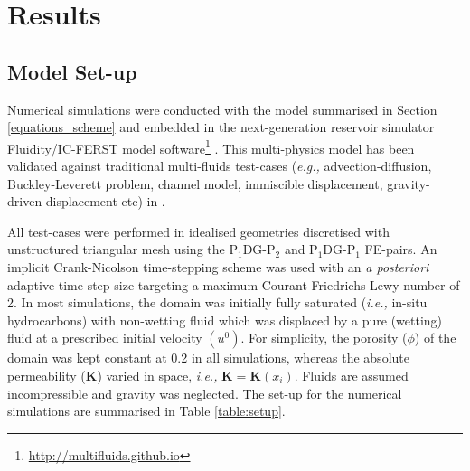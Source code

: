 \documentclass[preprint,authoryear,12pt]{elsarticle}
\newcommand{\PN}[2][error]{P$_{#1}$DG-P$_{#2}$}
\newcommand{\eg}{{\it e.g., }}
\newcommand{\ie}{{\it i.e., }}
\begin{document}


%

 

\section{Results}\label{section:results} 

\subsection{Model Set-up}\label{section:results:setup}
Numerical simulations were conducted with the model summarised in Section \ref{equations_scheme} and embedded in the next-generation reservoir simulator Fluidity/IC-FERST model software\footnote{\href{http://multifluids.github.io}{http://multifluids.github.io}} \citep[a full description of the model can be found in][]{porosity_documentation,fluidity_manual,jackson_2013,gomes_2017}. This multi-physics model has been validated against traditional multi-fluids test-cases (\eg advection-diffusion, Buckley-Leverett problem, channel model, immiscible displacement, gravity-driven displacement etc) in \citet{radunz_2014,jackson_2015,salinas2015,pavlidis2016}.
 
All test-cases were performed in idealised geometries discretised with unstructured triangular mesh using the \PN[1]{2} and \PN[1]{1} FE-pairs. An implicit Crank-Nicolson time-stepping scheme was used with an {\it a posteriori} adaptive time-step size targeting a maximum Courant-Friedrichs-Lewy \citep{courant_1941} number of 2. In most simulations, the domain was initially fully saturated (\ie in-situ hydrocarbons) with non-wetting fluid which was displaced by a pure (wetting) fluid at a prescribed initial velocity $\left(u^{0}\right)$. For simplicity, the porosity ($\phi$) of the domain was kept constant at 0.2 in all simulations, whereas the absolute permeability ($\mathbf{K}$) varied in space, \ie $\mathbf{K}=\mathbf{K}\left(x_{i}\right)$. Fluids are assumed incompressible and gravity was neglected. The set-up for the numerical simulations are summarised in Table \ref{table:setup}.
 
\end{document}

